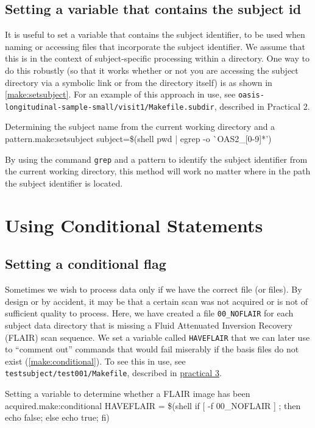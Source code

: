 \subsection{Setting a variable that contains the subject id }
It is useful to set a variable that contains the subject identifier, to be used when naming or accessing files that incorporate the subject identifier. We assume that this is in the context of subject-specific processing within a directory. One way to do this robustly (so that it works whether or not you are accessing the subject directory via a symbolic link or from the directory itself) is as shown in \autoref{make:setsubject}. For an example of this approach in use, see \texttt{oasis-longitudinal-sample-small/visit1/Makefile.subdir}, described in Practical 2.

\begin{make}{Determining the subject name from the current working directory and a pattern.}{make:setsubject}
subject=\$(shell pwd | egrep -o \`{}OAS2_[0-9]*')
\end{make}

By using the command \texttt{grep} and a pattern to identify the subject identifier from the current working directory, this method will work no matter where in the path the subject identifier is located.

\section{Using Conditional Statements}

\subsection{Setting a conditional flag}

Sometimes we wish to process data only if we have the correct file (or files). By design or by accident, it may be that a certain scan was not acquired or is not of sufficient quality to process. Here, we have created a file \texttt{00_NOFLAIR} for each subject data directory that is missing a Fluid Attenuated Inversion Recovery (FLAIR) scan sequence. We set a variable called \texttt{HAVEFLAIR} that we can later use to ``comment out'' commands that would fail miserably if the basis files do not exist (\autoref{make:conditional}). To see this in use, see \texttt{testsubject/test001/Makefile}, described in \hyperref[sec:practicum3]{practical 3}.

\begin{make}{Setting a variable to determine whether a FLAIR image has been acquired.}{make:conditional}
HAVEFLAIR = \$(shell if [ -f 00_NOFLAIR ] ; then echo false; else echo true; fi)
\end{make}

